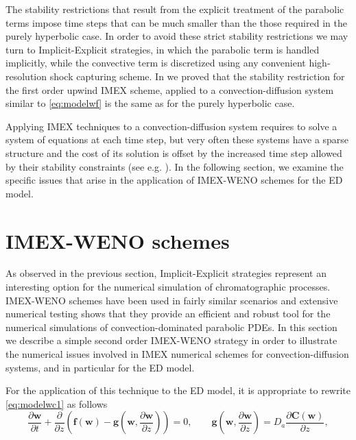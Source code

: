 \documentclass[preprint]{elsarticle}
\theoremstyle{definition}
\newcommand{\bw}{\boldsymbol w}
\newcommand{\bC}{\boldsymbol C}
\begin{document}
 The stability restrictions
that result from  the explicit treatment of the pa\-ra\-bo\-lic terms impose 
time steps that  can be   much smaller 
than the those required in the purely hyperbolic case. 
In order to avoid these strict stability restrictions  we
may turn to Implicit-Explicit strategies,  in which the parabolic term is handled
implicitly, while the convective term is discretized using any
convenient high-resolution shock capturing scheme. In  \cite{Donat1}
 we proved that the stability restriction for the first order upwind IMEX
 scheme, applied to  a convection-diffusion system similar to \eqref{eq:modelwf}
  is the same as for the purely hyperbolic case.

 Applying IMEX techniques to a convection-diffusion system requires to
 solve a system of equations at each time step, but very often these
  systems have a sparse structure and the cost of its solution is
  offset by the increased time step allowed by their stability
  constraints (see e.g. \cite{Donat1}). In the following section, we
  examine the specific issues that arise in the application of
  IMEX-WENO schemes for the ED model.






\section{IMEX-WENO schemes}\label{sec:imex-weno}
As observed in the previous section, Implicit-Explicit strategies
represent  an interesting option for the  numerical simulation of
chromatographic processes.  IMEX-WENO schemes have been
used in fairly similar scenarios \cite{Donat1,Guerrero} and extensive
numerical testing shows that they provide an efficient and robust
tool for the numerical simulations of convection-dominated parabolic
PDEs.  In this  
section we describe a simple  second order IMEX-WENO
strategy in order to illustrate the numerical issues involved in IMEX numerical
schemes for convection-diffusion systems, and in particular for the ED model.


For the application of this technique to the ED model, it is
appropriate to rewrite \eqref{eq:modelwc1} as follows
\begin{equation}
\label{eq:modelwc11}
\frac{\partial \bw}{\partial t} + \frac{\partial}{\partial
  z}\left(\boldsymbol{f}(\bw)- \boldsymbol{g}\left(\bw,
  \frac{\partial \bw}{\partial z}\right)\right)=0, \qquad
\boldsymbol{g}(\bw,
  \frac{\partial \bw}{\partial z})=D_a \frac{\partial \bC(\bw)}{\partial z},
\end{equation}
\end{document}
